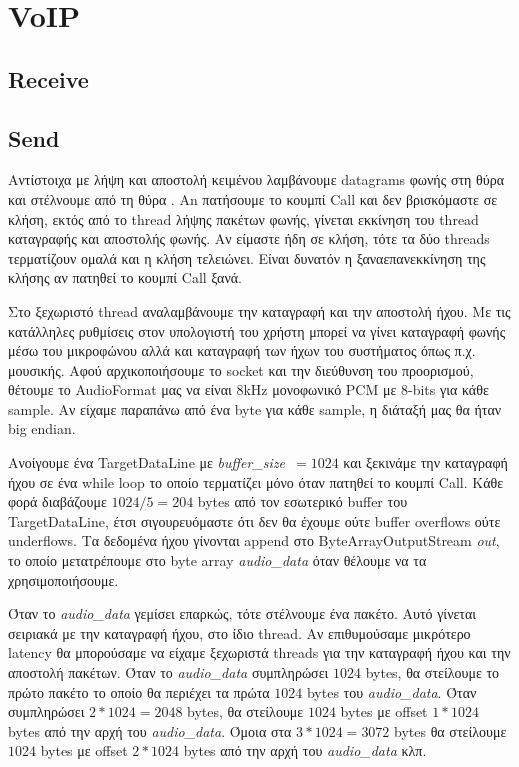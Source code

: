 \documentclass{article}
\begin{document}
\section{VoIP}
\subsection{Receive}
\subsection{Send}
Αντίστοιχα με λήψη και αποστολή κειμένου λαμβάνουμε datagrams φωνής στη θύρα \voicedestport{} και 
στέλνουμε από τη θύρα \voicesrcport. An πατήσουμε το κουμπί Call και δεν βρισκόμαστε σε κλήση, 
εκτός από το thread λήψης πακέτων φωνής, γίνεται εκκίνηση του thread καταγραφής και αποστολής φωνής.
Αν είμαστε ήδη σε κλήση, τότε τα δύο threads τερματίζουν ομαλά και η κλήση τελειώνει. Είναι δυνατόν
η ξαναεπανεκκίνηση της κλήσης αν πατηθεί το κουμπί Call ξανά.

Στο ξεχωριστό thread αναλαμβάνουμε την καταγραφή και την αποστολή ήχου. Με τις κατάλληλες ρυθμίσεις
στον υπολογιστή του χρήστη μπορεί να γίνει καταγραφή φωνής μέσω του μικροφώνου αλλά και καταγραφή των
ήχων του συστήματος όπως π.χ. μουσικής. Αφού αρχικοποιήσουμε το socket και την διεύθυνση του προορισμού,
θέτουμε το AudioFormat μας να είναι 8kHz μονοφωνικό PCM με 8-bits για κάθε sample. Αν είχαμε παραπάνω από 
ένα byte για κάθε sample, η διάταξή μας θα ήταν big endian. 

Ανοίγουμε ένα TargetDataLine με \mbox{\textit{buffer\_size} $= 1024$} και ξεκινάμε την καταγραφή ήχου
σε ένα while loop το οποίο τερματίζει μόνο όταν πατηθεί το κουμπί Call.
Κάθε φορά διαβάζουμε $1024/5 = 204$ bytes από τον εσωτερικό buffer του TargetDataLine, έτσι σιγουρευόμαστε
ότι δεν θα έχουμε ούτε buffer overflows ούτε underflows. Τα δεδομένα ήχου γίνονται append στο 
ByteArrayOutputStream \textit{out}, το οποίο μετατρέπουμε στο byte array \textit{audio\_data} όταν
θέλουμε να τα χρησιμοποιήσουμε.

Όταν το \textit{audio\_data} γεμίσει επαρκώς, τότε στέλνουμε ένα πακέτο. Αυτό γίνεται σειριακά με την
καταγραφή ήχου, στο ίδιο thread. Αν επιθυμούσαμε μικρότερο latency θα μπορούσαμε να είχαμε ξεχωριστά 
threads για την καταγραφή ήχου και την αποστολή πακέτων. Όταν το \textit{audio\_data}
συμπληρώσει $1024$ bytes, θα στείλουμε το πρώτο πακέτο το οποίο θα περιέχει τα πρώτα $1024$ bytes
του \textit{audio\_data}. Όταν συμπληρώσει $2*1024 = 2048$ bytes, θα στείλουμε $1024$ bytes με
offset $1*1024$ bytes από την αρχή του \textit{audio\_data}. Όμοια στα  $3*1024 = 3072$ bytes
θα στείλουμε $1024$ bytes με offset $2*1024$ bytes από την αρχή του \textit{audio\_data} κλπ.
\end{document}
